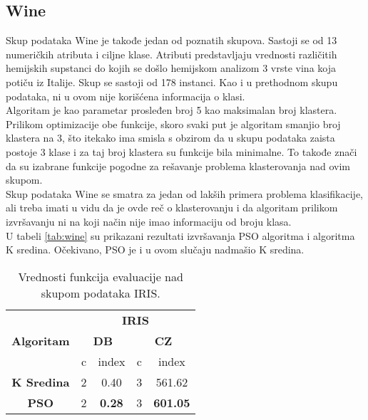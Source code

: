\documentclass[a4paper,serbian]{symopissr}
\begin{document}
\subsection{Wine}
Skup podataka Wine \cite{uci_wine} je takođe jedan od poznatih skupova. Sastoji se od 13 numeričkih atributa i ciljne klase. Atributi predstavljaju vrednosti različitih hemijskih supstanci do kojih se došlo hemijskom analizom 3 vrste vina koja potiču iz Italije. Skup se sastoji od 178 instanci. Kao i u prethodnom skupu podataka, ni u ovom nije korišćena informacija o klasi.\\
Algoritam je kao parametar prosleđen broj 5 kao maksimalan broj klastera. Prilikom optimizacije obe funkcije, skoro svaki put je algoritam smanjio broj klastera na 3, što itekako ima smisla s obzirom da u skupu podataka zaista postoje 3 klase i za taj broj klastera su funkcije bila minimalne. To takođe znači da su izabrane funkcije pogodne za rešavanje problema klasterovanja nad ovim skupom.\\
Skup podataka Wine se smatra za jedan od lakših primera problema klasifikacije, ali treba imati u vidu da je ovde reč o klasterovanju i da algoritam prilikom izvršavanju ni na koji način nije imao informaciju od broju klasa.\\
U tabeli \ref{tab:wine} su prikazani rezultati izvršavanja PSO algoritma i algoritma K sredina. Očekivano, PSO je i u ovom slučaju nadmašio K sredina.

\begin{table}[]
\begin{tabular}{|l|c|c|c|c|}
\hline
\multirow{3}{*}{\textbf{Algoritam}}      & \multicolumn{4}{c|}{\textbf{IRIS}}                                        \\ \cline{2-5} 
                                         & \multicolumn{2}{c|}{\textbf{DB}} & \multicolumn{2}{c|}{\textbf{CZ}} \\ \cline{2-5} 
                                  
     & c         & index                & c & index                                \\ \hline
\multicolumn{1}{|c|}{\textbf{K Sredina}} & 2         & 0.40                & 3 & 561.62                               \\ \hline
\multicolumn{1}{|c|}{\textbf{PSO}}       & 2         & \textbf{0.28}        & 3 & \multicolumn{1}{l|}{\textbf{601.05}} \\ \hline
\end{tabular}
\caption{\label{tab:iris}Vrednosti funkcija evaluacije nad skupom podataka IRIS.}
\end{table}
\end{document}
